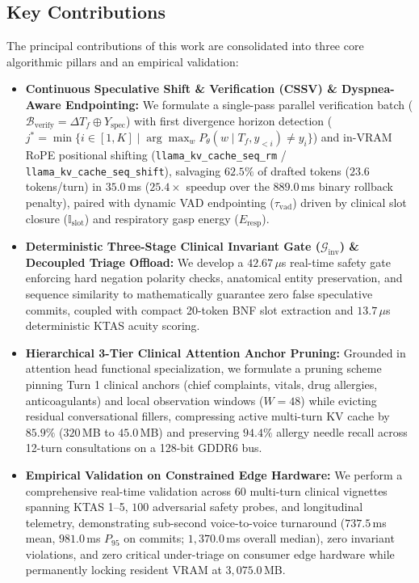 \documentclass[10pt,journal,compsoc]{IEEEtran}
\begin{document}
\subsection{Key Contributions}
The principal contributions of this work are consolidated into three core algorithmic pillars and an empirical validation:
\begin{itemize}
    \item \textbf{Continuous Speculative Shift \& Verification (CSSV) \& Dyspnea-Aware Endpointing:} We formulate a single-pass parallel verification batch ($\mathcal{B}_{\text{verify}} = \Delta T_f \oplus Y_{\text{spec}}$) with first divergence horizon detection ($j^* = \min \{ i \in [1, K] \mid \arg\max_{w} P_\theta(w \mid T_f, y_{<i}) \neq y_i \}$) and in-VRAM RoPE positional shifting (\texttt{llama\_kv\_cache\_seq\_rm} / \texttt{llama\_kv\_cache\_seq\_shift}), salvaging $62.5\%$ of drafted tokens ($23.6$ tokens/turn) in $35.0$\,ms ($25.4\times$ speedup over the $889.0$\,ms binary rollback penalty), paired with dynamic VAD endpointing ($\tau_{\text{vad}}$) driven by clinical slot closure ($\mathbb{I}_{\text{slot}}$) and respiratory gasp energy ($E_{\text{resp}}$).
    \item \textbf{Deterministic Three-Stage Clinical Invariant Gate ($\mathcal{G}_{\text{inv}}$) \& Decoupled Triage Offload:} We develop a $42.67\,\mu$s real-time safety gate enforcing hard negation polarity checks, anatomical entity preservation, and sequence similarity to mathematically guarantee zero false speculative commits, coupled with compact 20-token BNF slot extraction and $13.7\,\mu$s deterministic KTAS acuity scoring.
    \item \textbf{Hierarchical 3-Tier Clinical Attention Anchor Pruning:} Grounded in attention head functional specialization, we formulate a pruning scheme pinning Turn 1 clinical anchors (chief complaints, vitals, drug allergies, anticoagulants) and local observation windows ($W=48$) while evicting residual conversational fillers, compressing active multi-turn KV cache by $85.9\%$ ($320$\,MB to $45.0$\,MB) and preserving $94.4\%$ allergy needle recall across 12-turn consultations on a 128-bit GDDR6 bus.
    \item \textbf{Empirical Validation on Constrained Edge Hardware:} We perform a comprehensive real-time validation across $60$ multi-turn clinical vignettes spanning KTAS 1--5, $100$ adversarial safety probes, and longitudinal telemetry, demonstrating sub-second voice-to-voice turnaround ($737.5$\,ms mean, $981.0$\,ms $P_{95}$ on commits; $1{,}370.0$\,ms overall median), zero invariant violations, and zero critical under-triage on consumer edge hardware while permanently locking resident VRAM at $3{,}075.0$\,MB.
\end{itemize}
\end{document}
